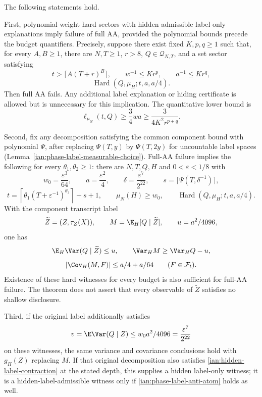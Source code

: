 \begin{theorem}
\label{ian:hidden-label-operational-theorem}
The following statements hold.

First, polynomial-weight hard sectors with hidden admissible label-only explanations imply failure of full AA, provided the polynomial bounds precede the budget quantifiers. Precisely, suppose there exist fixed \(K,p,q\ge1\) such that, for every \(A,B\ge1\), there are \(N,T\ge1\), \(r>8\), \(Q\in\mathcal Q_{N,T}\), and a set sector satisfying
\[
 t>\lceil A(T+r)^B\rceil,\qquad
 w^{-1}\le Kr^p,\qquad a^{-1}\le Kr^q,
\]
\[
 \operatorname{Hard}(Q,\mu_H;t,a,a/4).
\]
Then full AA fails. Any additional label explanation or hiding certificate is allowed but is unnecessary for this implication. The quantitative lower bound is
\[
 \ell_{\mu_N}(t,Q)\ge\frac34wa
 \ge\frac{3}{4K^2r^{p+q}}.
\]

Second, fix any decomposition satisfying the common component bound with polynomial \(\Psi\), after replacing \(\Psi(T,y)\) by \(\Psi(T,2y)\) for uncountable label spaces (Lemma~\ref{ian:phase-label-measurable-choice}). Full-AA failure implies the following for every
\(\theta_1,\theta_2\ge1\): there are \(N,T,Q,H\) and
\(0<\varepsilon<1/8\) with
\[
 w_0=\frac{\varepsilon^3}{64},\qquad
 a=\frac{\varepsilon^2}{4},\qquad
 \delta=\frac{\varepsilon^7}{2^{22}},\qquad
 s=\lceil\Psi(T,\delta^{-1})\rceil,
\]
\[
 t=\left\lceil\theta_1(T+\varepsilon^{-1})^{\theta_2}\right\rceil+s+1,
 \qquad
 \mu_N(H)\ge w_0,\qquad
 \operatorname{Hard}(Q,\mu_H;t,a,a/4).
\]
With the component transcript label
\[
 \widetilde Z=(Z,\tau_Z(X)),\qquad
 M=\E_H[Q\mid\widetilde Z],\qquad u=a^2/4096,
\]
one has
\[
 \E_H\Var(Q\mid\widetilde Z)\le u,\qquad
 \Var_H M\ge\Var_HQ-u,
\]
\[
 |\Cov_H(M,F)|\le a/4+a/64
 \qquad(F\in\mathcal F_t).
\]
Existence of these hard witnesses for every budget is also sufficient for full-AA failure. The theorem does not assert that every observable of
\(\widetilde Z\) satisfies no shallow disclosure.

Third, if the original label additionally satisfies
\[
 v=\E\Var(Q\mid Z)\le w_0a^2/4096
   =\frac{\varepsilon^7}{2^{22}}
\]
on these witnesses, the same variance and covariance conclusions hold with
\(g_H(Z)\) replacing \(M\). If that original decomposition also satisfies \eqref{ian:hidden-label-contraction} at the stated depth, this supplies a hidden label-only witness; it is a hidden-label-admissible witness only if \eqref{ian:phase-label-anti-atom} holds as well.
\end{theorem}

